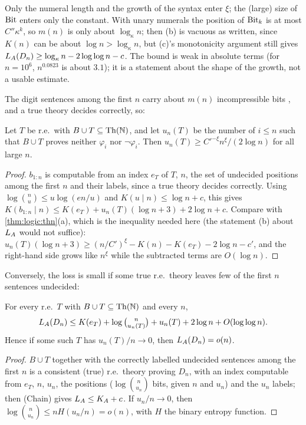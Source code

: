 Only the numeral length and the growth of the syntax enter $\xi$; the (large) size of $\mathrm{Bit}$ enters only the constant. With unary numerals the position of $\mathrm{Bit}_k$ is at most $C''\kappa^k$, so $m(n)$ is only about $\log_\kappa n$; then (b) is vacuous as written, since $K(n)$ can be about $\log n>\log_\kappa n$, but (c)'s monotonicity argument still gives $L_{A}(D_n)\ge\log_\kappa n-2\log\log n-c$. The bound is weak in absolute terms (for $n=10^6$, $n^{0.0823}$ is about $3.1$); it is a statement about the shape of the growth, not a usable estimate.

The digit sentences among the first $n$ carry about $m(n)$ incompressible bits \citep{chaitin1975theory}, and a true theory decides correctly, so:

\begin{corollary}\label{cor:logic:undecided}
Let $T$ be r.e.\ with $B\cup T\subseteq\mathrm{Th}(\mathbb N)$, and let $u_n(T)$ be the number of $i\le n$ such that $B\cup T$ proves neither $\varphi_i$ nor $\neg\varphi_i$. Then $u_n(T)\ge C'^{-\xi}n^\xi/(2\log n)$ for all large $n$.
\end{corollary}

\begin{proof}
$b_{1:n}$ is computable from an index $e_T$ of $T$, $n$, the set of undecided positions among the first $n$ and their labels, since a true theory decides correctly. Using $\log\binom nu\le u\log(en/u)$ and $K(u\mid n)\le\log n+c$, this gives $K(b_{1:n}\mid n)\le K(e_T)+u_n(T)(\log n+3)+2\log n+c$. Compare with \cref{thm:logic:thn}(a), which is the inequality needed here (the statement (b) about $L_{A}$ would not suffice): $u_n(T)(\log n+3)\ge(n/C')^\xi-K(n)-K(e_T)-2\log n-c'$, and the right-hand side grows like $n^\xi$ while the subtracted terms are $O(\log n)$.
\end{proof}

Conversely, the loss is small if some true r.e.\ theory leaves few of the first $n$ sentences undecided:

\begin{proposition}\label{prop:logic:generic}
For every r.e.\ $T$ with $B\cup T\subseteq\mathrm{Th}(\mathbb N)$ and every $n$,
\[
L_{A}(D_n)\le K(e_T)+\log\tbinom{n}{u_n(T)}+u_n(T)+2\log n+O(\log\log n).
\]
Hence if some such $T$ has $u_n(T)/n\to0$, then $L_{A}(D_n)=o(n)$.
\end{proposition}

\begin{proof}
$B\cup T$ together with the correctly labelled undecided sentences among the first $n$ is a consistent (true) r.e.\ theory proving $D_n$, with an index computable from $e_T$, $n$, $u_n$, the positions ($\log\binom n{u_n}$ bits, given $n$ and $u_n$) and the $u_n$ labels; then (Chain) gives $L_{A}\le K_{A}+c$. If $u_n/n\to0$, then $\log\binom n{u_n}\le nH(u_n/n)=o(n)$, with $H$ the binary entropy function.
\end{proof}


